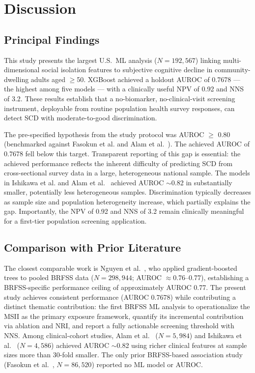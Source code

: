 \documentclass[12pt,a4paper]{article}
\begin{document}
\section{Discussion}

\subsection{Principal Findings}

This study presents the largest U.S.\ ML analysis ($N = 192{,}567$) linking
multi-dimensional social isolation features to subjective cognitive decline
in community-dwelling adults aged $\geq$50. XGBoost achieved a holdout AUROC
of 0.7678 --- the highest among five models --- with a clinically useful NPV of
0.92 and NNS of 3.2. These results establish that a no-biomarker, no-clinical-visit
screening instrument, deployable from routine population health survey responses,
can detect SCD with moderate-to-good discrimination.

The pre-specified hypothesis from the study protocol was AUROC $\geq$ 0.80
(benchmarked against Fasokun et al. \cite{Fasokun2026} and Alam et al.\
\cite{Alam2026}). The achieved AUROC of 0.7678 fell below this target.
Transparent reporting of this gap is essential: the achieved performance
reflects the inherent difficulty of predicting SCD from cross-sectional survey
data in a large, heterogeneous national sample. The models in Ishikawa et al.
\cite{Ishikawa2025} and Alam et al.\ \cite{Alam2026} achieved AUROC $\sim$0.82
in substantially smaller, potentially less heterogeneous samples. Discrimination
typically decreases as sample size and population heterogeneity increase,
which partially explains the gap. Importantly, the NPV of 0.92 and NNS of 3.2
remain clinically meaningful for a first-tier population screening application.

\subsection{Comparison with Prior Literature}

The closest comparable work is Nguyen et al.\ \cite{Nguyen2026}, who applied
gradient-boosted trees to pooled BRFSS data ($N = 298{,}944$; AUROC
$\approx$0.76--0.77), establishing a BRFSS-specific performance ceiling
of approximately AUROC 0.77. The present study achieves consistent performance
(AUROC 0.7678) while contributing a distinct thematic contribution: the first
BRFSS ML analysis to operationalize the MSII as the primary exposure
framework, quantify its incremental contribution via ablation and NRI, and
report a fully actionable screening threshold with NNS. Among clinical-cohort
studies, Alam et al.\ \cite{Alam2026} ($N = 5{,}984$) and Ishikawa et al.\
\cite{Ishikawa2025} ($N = 4{,}586$) achieved AUROC $\sim$0.82 using richer
clinical features at sample sizes more than 30-fold smaller.
The only prior BRFSS-based association study (Fasokun et al.\ \cite{Fasokun2026},
$N = 86{,}520$) reported no ML model or AUROC.
\end{document}
